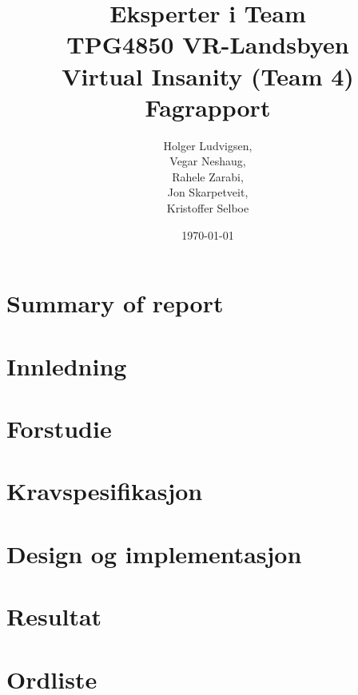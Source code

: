 \documentclass[12pt]{report}
\title{{\Large Eksperter i Team\\TPG4850 VR-Landsbyen\\{\bf Virtual Insanity (Team 4)\\Fagrapport}}}
\author{Holger Ludvigsen,\\Vegar Neshaug,\\Rahele Zarabi,\\Jon Skarpetveit,\\Kristoffer Selboe}
\date{{\small \today}}
\begin{document}
\maketitle

\chapter{Summary of report}
	
\pagebreak
	
\setlength{\parskip}{0.0in}
\tableofcontents
\setlength{\parskip}{0.1in}

\chapter{Innledning}

	

\chapter{Forstudie}

	

\chapter{Kravspesifikasjon}

	
	
\chapter{Design og implementasjon}

	

\chapter{Resultat}

	



\chapter{Ordliste}

	

	

\end{document}
